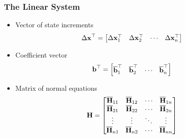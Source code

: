 \begin{frame}
    \frametitle{The Linear System}
   
    \begin{itemize}
    \item Vector of state increments
    \begin{equation*}
    \Delta\boldsymbol{\mathbf{x}}^{\top} =
    \begin{bmatrix}
    \Delta\boldsymbol{\mathbf{x}}_{1}^{\top} & \Delta\boldsymbol{\mathbf{x}}_{2}^{\top} & \cdots & \Delta\boldsymbol{\mathbf{x}}_{n}^{\top}
    \end{bmatrix}
    \end{equation*}
    \item Coefficient vector
    \begin{equation*}
    \boldsymbol{\mathbf{b}}^{\top} =
    \begin{bmatrix}
    \overline{\boldsymbol{\mathbf{b}}}_{1}^{\top} & \overline{\boldsymbol{\mathbf{b}}}_{2}^{\top} & \cdots & \overline{\boldsymbol{\mathbf{b}}}_{n}^{\top}
    \end{bmatrix}
    \end{equation*}
    \item Matrix of normal equations
    \begin{equation*}
    \boldsymbol{\mathbf{H}} =
    \begin{bmatrix}
    \overline{\boldsymbol{\mathbf{H}}}_{11} & \overline{\boldsymbol{\mathbf{H}}}_{12} & \cdots & \overline{\boldsymbol{\mathbf{H}}}_{1n}\\
    \overline{\boldsymbol{\mathbf{H}}}_{21} & \overline{\boldsymbol{\mathbf{H}}}_{22} & \cdots & \overline{\boldsymbol{\mathbf{H}}}_{2n}\\
    \vdots & \vdots & \ddots & \vdots\\
    \overline{\boldsymbol{\mathbf{H}}}_{n1} & \overline{\boldsymbol{\mathbf{H}}}_{n2} & \cdots & \overline{\boldsymbol{\mathbf{H}}}_{nn}\\
   \end{bmatrix}
   \end{equation*}
   \end{itemize}
   
   \end{frame}
   
